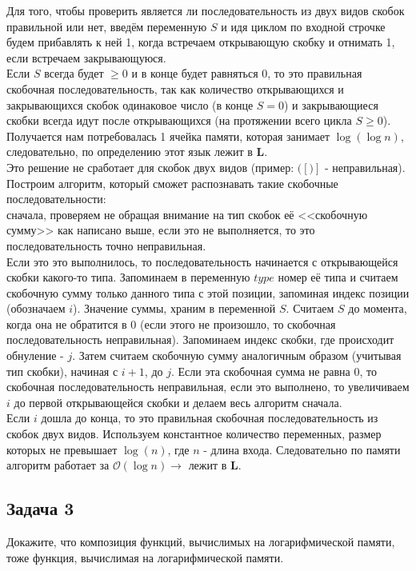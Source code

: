 \documentclass[a4paper,12pt]{article} %
\begin{document}
Для того, чтобы проверить является ли последовательность из двух видов скобок правильной или нет, введём переменную $ S $ и идя циклом по входной строчке будем прибавлять к ней 1, когда встречаем открывающую скобку и отнимать 1, если встречаем закрывающуюся.\\ Если $ S $ всегда будет $ \geq 0 $ и в конце будет равняться 0, то это правильная скобочная последовательность, так как количество открывающихся и закрывающихся скобок одинаковое число (в конце $ S = 0 $) и закрывающиеся скобки всегда идут после открывающихся (на протяжении всего цикла $ S \geq 0 $).\\
Получается нам потребовалась 1 ячейка памяти, которая занимает $ \log (\log n) $, следовательно, по определению этот язык лежит в $\mathbf{L}$.\\

Это решение не сработает для скобок двух видов (пример: $ ([)] $ - неправильная). Построим алгоритм, который сможет распознавать такие скобочные последовательности:\\
сначала, проверяем не обращая внимание на тип скобок её <<скобочную сумму>> как написано выше, если это не выполняется, то это последовательность точно неправильная. \\Если это это выполнилось, то последовательность начинается с открывающейся скобки какого-то типа. Запоминаем в переменную $ type $ номер её типа и считаем скобочную сумму только данного типа с этой позиции, запоминая индекс позиции (обозначаем $ i $). Значение суммы, храним в переменной $ S $. Считаем $ S $ до момента, когда она не обратится в 0 (если этого не произошло, то скобочная последовательность неправильная). Запоминаем индекс скобки, где происходит обнуление - $ j $. Затем считаем скобочную сумму аналогичным образом (учитывая тип скобки), начиная с $ i + 1 $, до $ j $. Если эта скобочная сумма не равна 0, то скобочная последовательность неправильная, если это выполнено, то увеличиваем $ i $ до первой открывающейся скобки и делаем весь алгоритм сначала.\\

Если $ i $ дошла до конца, то это правильная скобочная последовательность из скобок двух видов. Используем константное количество переменных, размер которых не превышает $ \log(n) $, где $ n $ - длина входа. Следовательно по памяти алгоритм работает за $ \mathcal{O}(\log n) \longrightarrow $ лежит в $\mathbf{L}$.

\subsection*{Задача 3}
Докажите, что композиция функций, вычислимых на логарифмической памяти, тоже функция, вычислимая на логарифмической памяти.\\
\end{document}
